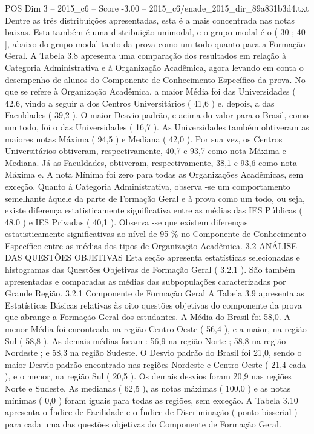\begin{textsample}{POS Dim 3 – 2015\_c6 – Score -3.00 – 2015\_c6/enade\_2015\_dir\_89a831b3d4.txt}
Dentre as três distribuições apresentadas, esta é a mais concentrada nas notas baixas.
Esta também é uma distribuição unimodal, e o grupo modal é o ( 30 ; 40 ], abaixo do grupo modal tanto da prova como um todo quanto para a Formação Geral.
A Tabela 3.8 apresenta uma comparação dos resultados em relação à Categoria Administrativa e à Organização Acadêmica, agora levando em conta o desempenho de alunos do Componente de Conhecimento Específico da prova.
No que se refere à Organização Acadêmica, a maior Média foi das Universidades ( 42,6, vindo a seguir a dos Centros Universitários ( 41,6 ) e, depois, a das Faculdades ( 39,2 ).
O maior Desvio padrão, e acima do valor para o Brasil, como um todo, foi o das Universidades ( 16,7 ).
As Universidades também obtiveram as maiores notas Máxima ( 94,5 ) e Mediana ( 42,0 ).
Por sua vez, os Centros Universitários obtiveram, respectivamente, 40,7 e 93,7 como nota Máxima e Mediana.
Já as Faculdades, obtiveram, respectivamente, 38,1 e 93,6 como nota Máxima e.
A nota Mínima foi zero para todas as Organizações Acadêmicas, sem exceção.
Quanto à Categoria Administrativa, observa -se um comportamento semelhante àquele da parte de Formação Geral e à prova como um todo, ou seja, existe diferença estatisticamente significativa entre as médias das IES Públicas ( 48,0 ) e IES Privadas ( 40,1 ).
Observa -se que existem diferenças estatisticamente significativas ao nível de 95 \% no Componente de Conhecimento Específico entre as médias dos tipos de Organização Acadêmica. 3.2 ANÁLISE DAS QUESTÕES OBJETIVAS Esta seção apresenta estatísticas selecionadas e histogramas das Questões Objetivas de Formação Geral ( 3.2.1 ).
São também apresentadas e comparadas as médias das subpopulações caracterizadas por Grande Região. 3.2.1 Componente de Formação Geral A Tabela 3.9 apresenta as Estatísticas Básicas relativas às oito questões objetivas do componente da prova que abrange a Formação Geral dos estudantes.
A Média do Brasil foi 58,0.
A menor Média foi encontrada na região Centro-Oeste ( 56,4 ), e a maior, na região Sul ( 58,8 ).
As demais médias foram : 56,9 na região Norte ; 58,8 na região Nordeste ; e 58,3 na região Sudeste.
O Desvio padrão do Brasil foi 21,0, sendo o maior Desvio padrão encontrado nas regiões Nordeste e Centro-Oeste ( 21,4 cada ), e o menor, na região Sul ( 20,5 ).
Os demais desvios foram 20,9 nas regiões Norte e Sudeste.
As medianas ( 62,5 ), as notas máximas ( 100,0 ) e as notas mínimas ( 0,0 ) foram iguais para todas as regiões, sem exceção.
A Tabela 3.10 apresenta o Índice de Facilidade e o Índice de Discriminação ( ponto-bisserial ) para cada uma das questões objetivas do Componente de Formação Geral.

\end{textsample}
